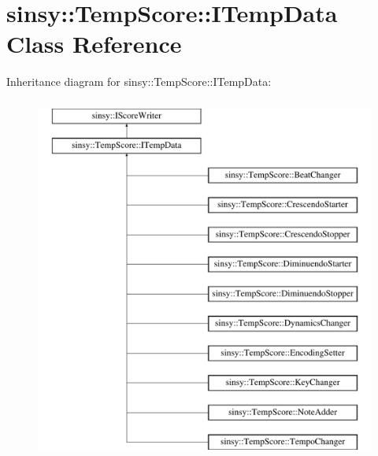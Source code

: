 \hypertarget{classsinsy_1_1TempScore_1_1ITempData}{\section{sinsy\-:\-:\-Temp\-Score\-:\-:\-I\-Temp\-Data \-Class \-Reference}
\label{classsinsy_1_1TempScore_1_1ITempData}
}
\-Inheritance diagram for sinsy\-:\-:\-Temp\-Score\-:\-:\-I\-Temp\-Data\-:\begin{figure}[H]
\begin{center}
\leavevmode
\includegraphics[height=12.000000cm]{classsinsy_1_1TempScore_1_1ITempData}
\end{center}
\end{figure}
